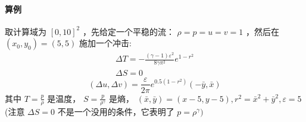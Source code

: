 \documentclass{book}
\begin{document}
\paragraph{算例}


\begin{example}[光滑算例]
    取计算域为  $[0,10]^{2}$  ，先给定一个平稳的流： $\rho=p=u=v=1$  ，然后在  $\left(x_{0}, y_{0}\right)=(5,5)$  施加一个冲击:
    \begin{equation}
        \begin{array}{l}
            \Delta T=-\frac{(\gamma-1) \varepsilon^{2}}{8 \gamma \pi^{2}} e^{1-r^{2}} \\
            \Delta S=0
        \end{array}
    \end{equation}
    \begin{equation}
        (\Delta u, \Delta v)=\frac{\varepsilon}{2 \pi} e^{0.5\left(1-r^{2}\right)}(-\bar{y}, \bar{x})
    \end{equation}
    其中  $T=\frac{p}{\rho}$  是温度，  $S=\frac{p}{\rho^{\gamma}}$  是熵，  $(\bar{x}, \bar{y})=(x-5, y-5) , r^{2}=\bar{x}^{2}+\bar{y}^{2}, \varepsilon=5 $
    (注意 $\Delta S=0$ 不是一个没用的条件，它表明了 $ p=\rho^{\gamma}  )$
\end{example}
\end{document}
